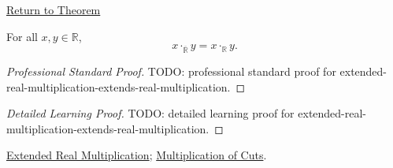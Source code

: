 \newpage
{}
\label{prf:extended-real-multiplication-extends-real-multiplication}
\begin{remark*}[Return]
\hyperref[thm:extended-real-multiplication-extends-real-multiplication]{Return to Theorem}
\end{remark*}
\begin{theorem*}
For all $x,y\in\mathbb{R}$,
\[
x\cdot_{\overline{\mathbb{R}}}y=x\cdot_{\mathbb{R}}y.
\]
\end{theorem*}
\begin{proof}[Professional Standard Proof]
\LRAProofBodyStart
TODO: professional standard proof for extended-real-multiplication-extends-real-multiplication.
\end{proof}
\begin{proof}[Detailed Learning Proof]
\LRAProofBodyStart
TODO: detailed learning proof for extended-real-multiplication-extends-real-multiplication.
\end{proof}
\begin{remark*}
\end{remark*}
\begin{dependencies}
\hyperref[def:extended-real-multiplication]{Extended Real Multiplication};
\hyperref[def:multiplication-on-r]{Multiplication of Cuts}.
\end{dependencies}
\clearpage

